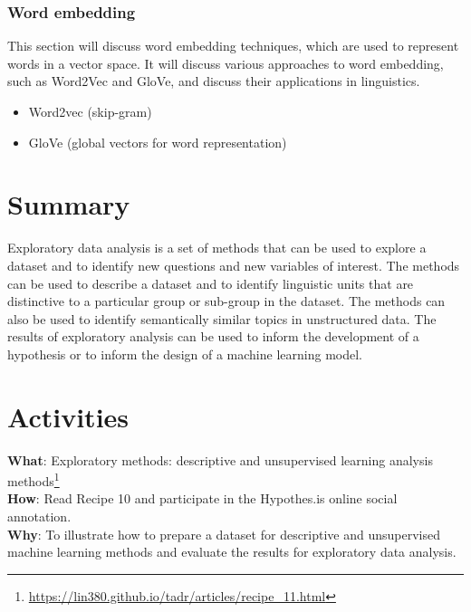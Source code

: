 \documentclass[
  letterpaper,
]{latex/krantz}
\providecommand{\tightlist}{%
  \setlength{\itemsep}{0pt}\setlength{\parskip}{0pt}}\usepackage{longtable,booktabs,array}
\DeclareRobustCommand{\href}[2]{#2\footnote{\url{#1}}}
\begin{document}
\hypertarget{eda-word-embedding}{%
\subsubsection{Word embedding}\label{eda-word-embedding}}

This section will discuss word embedding techniques, which are used to
represent words in a vector space. It will discuss various approaches to
word embedding, such as Word2Vec and GloVe, and discuss their
applications in linguistics.

\begin{itemize}
\tightlist
\item
  Word2vec (skip-gram)
\item
  GloVe (global vectors for word representation)
\end{itemize}

\hypertarget{summary-11}{%
\section{Summary}\label{summary-11}}

Exploratory data analysis is a set of methods that can be used to
explore a dataset and to identify new questions and new variables of
interest. The methods can be used to describe a dataset and to identify
linguistic units that are distinctive to a particular group or sub-group
in the dataset. The methods can also be used to identify semantically
similar topics in unstructured data. The results of exploratory analysis
can be used to inform the development of a hypothesis or to inform the
design of a machine learning model.

\hypertarget{activities-7}{%
\section*{Activities}\label{activities-7}}


\begin{tcolorbox}[enhanced jigsaw, colbacktitle=quarto-callout-tip-color!10!white, arc=.35mm, toprule=.15mm, breakable, colframe=quarto-callout-tip-color-frame, bottomrule=.15mm, opacitybacktitle=0.6, coltitle=black, titlerule=0mm, colback=white, toptitle=1mm, bottomtitle=1mm, title=\textcolor{quarto-callout-tip-color}{\faLightbulb}\hspace{0.5em}{Recipe}, rightrule=.15mm, leftrule=.75mm, opacityback=0, left=2mm]

\textbf{What}:
\href{https://lin380.github.io/tadr/articles/recipe_11.html}{Exploratory
methods: descriptive and unsupervised learning analysis methods}\\
\textbf{How}: Read Recipe 10 and participate in the Hypothes.is online
social annotation.\\
\textbf{Why}: To illustrate how to prepare a dataset for descriptive and
unsupervised machine learning methods and evaluate the results for
exploratory data analysis.

\end{tcolorbox}
\end{document}
